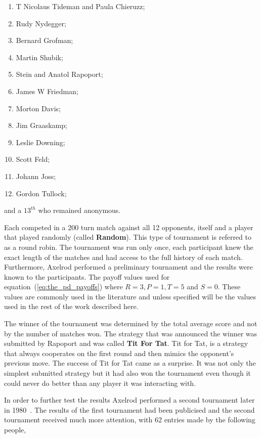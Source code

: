 \documentclass{article}
\theoremstyle{definition}
\begin{document}
\begin{multicols}{2}
    \begin{enumerate}
        \item T Nicolaus Tideman and Paula Chieruzz;
        \item Rudy Nydegger;
        \item Bernard Grofman;
        \item Martin Shubik;
        \item Stein and Anatol Rapoport;
        \item James W Friedman;
        \item Morton Davis;
        \item Jim Graaskamp;
        \item Leslie Downing;
        \item Scott Feld;
        \item Johann Joss;
        \item Gordon Tullock;
    \end{enumerate}
\end{multicols}

and a \(13^{th}\) who remained anonymous.

Each competed in a 200 turn match against all 12 opponents, itself and a player
that played randomly (called \textbf{Random}). This type of tournament is referred to as a round robin.
The tournament was run only once, each participant knew
the exact length of the matches and had access to the full history of each match.
Furthermore, Axelrod performed a preliminary tournament and the results were known
to the participants. The payoff values used for equation~(\ref{eq:the_pd_payoffs}) where
\(R=3, P=1, T=5\) and \(S=0\). These values are commonly used in the literature
and unless specified will be the values used in the rest of the work described here.

The winner of the tournament was determined by the total average score and not by
the number of matches won. The strategy that was announced the winner was
submitted by Rapoport and was called \textbf{Tit For Tat}. Tit for Tat, is a
strategy that always cooperates on the first round and then mimics the opponent's
previous move.
The success of Tit for Tat came as a surprise. It was not only the simplest submitted
strategy but it had also won the tournament even though it could never do better
than any player it was interacting with.

In order to further test the results Axelrod performed a second
tournament later in 1980~\cite{Axelrod1980b}. The results of the first tournament
had been publicised and the second tournament received much more attention, with 62 entries
made by the following people,
\end{document}

